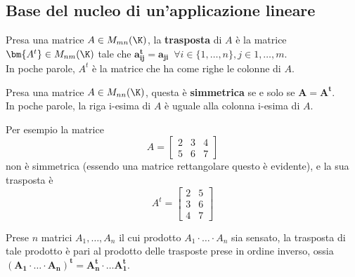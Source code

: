 \documentclass[11pt, a4paper, titlepage, oneside]{scrbook}
\begin{document}
\subsection{Base del nucleo di un'applicazione lineare}

\begin{Definizione}[Trasposta]
\label{def-trasp}
Presa una matrice $A \in M_{mn}(\K)$, la \textbf{trasposta} di $A$ è la matrice $\bm{A^t} \in M_{nm}(\K)$ tale che \mbox{$\bm{a_{ij}^t = a_{ji}} \enspace \forall i \in \{1, \ldots, n\}, j \in {1, \ldots, m}$}. \\
In poche parole, $A^t$ è la matrice che ha come righe le colonne di $A$. 
\end{Definizione}

\begin{Definizione}[Simmetrica]
\label{def-simmetrica}
Presa una matrice $A \in M_{nn}(\K)$, questa è \textbf{simmetrica} se e solo se $\bm{A = A^t}$. \\
In poche parole, la riga i-esima di $A$ è uguale alla colonna i-esima di $A$.  
\end{Definizione}

Per esempio la matrice 
\[ A =
\begin{bmatrix}
    2 & 3 & 4 \\
    5 & 6 & 7
\end{bmatrix}
\]
non è simmetrica (essendo una matrice rettangolare questo è evidente), e la sua trasposta è
\[ A^t =
\begin{bmatrix}
    2 & 5 \\ 
    3 & 6 \\
    4 & 7
\end{bmatrix}\]

\begin{Proposizione}
\label{propos-trasposta-prodotto}
Prese $n$ matrici $A_1, \ldots, A_n$ il cui prodotto $A_1 \cdot \ldots \cdot A_n$ sia sensato, la trasposta di tale prodotto è pari al prodotto delle trasposte prese in ordine inverso, ossia \mbox{$\bm{(A_1 \cdot \ldots \cdot A_n)^t = A_n^t \cdot \ldots A_1^t}$}. 
\end{Proposizione}

\Dimostrazione \nopagebreak
\end{document}
